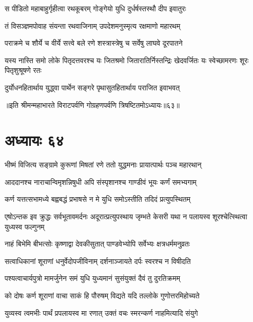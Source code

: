 \twolineshloka
{स पीडितो महाबाहुर्गृहीत्वा रथकूबरम्}
{गोङ्गेयो युधि दुर्धर्षस्तस्थौ दीप इवातुरः}


\twolineshloka
{तं विसञ्ज्ञमपोवाह संयन्ता रथवाजिनाम्}
{उपदेशमनुस्मृत्य रक्षमाणो महारथम्}


\twolineshloka
{पराक्रमे च शौर्ये च वीर्ये सत्त्वे बले रणे}
{शस्त्रास्त्रेषु च सर्वेषु लाघवे दूरपातने}


\threelineshloka
{यस्य नास्ति समो लोके पितृदत्तवरश्च यः}
{जितश्रमो जितारातिर्निस्तन्द्रिः खेदवर्जितः}
{यः स्वेच्छामरणः शूरः पितृशुश्रूषणे रतः}


\twolineshloka
{दुर्योधनहितार्थाय युद्ध्वा पार्थेन सङ्गरे}
{पृथासुतहितार्थाय पराजित इवाभवत्}

॥इति श्रीमन्महाभारते विराटपर्वणि गोग्रहणपर्वणि त्रिषष्टितमोऽध्यायः॥६३॥

\chapter{अध्यायः ६४}

\twolineshloka
{भीष्मं विजित्य सङ्ग्रामे कुरूणां मिषतां रणे}
{ततो युद्धमनाः प्रायात्पार्थः पञ्च महारथान्}


\twolineshloka
{आददानश्च नाराचान्विमृशन्निषुधी अपि}
{संस्पृशानश्च गाण्डीवं भूयः कर्णं समभ्यगाम्}




\twolineshloka
{कर्ण यत्तत्सभामध्ये बह्वबद्धं प्रभाषसे}
{न मे युधि समोऽस्तीति तदिदं प्रत्युपस्थितम्}


\threelineshloka
{एषोऽन्तक इव क्रुद्धः सर्वभूतावमर्दनः}
{अदूरात्प्रत्युपस्थाय जृम्भते केसरी यथा}
{न पलायस्व शूरश्चेत्स्थित्वा युध्यस्व फल्गुनम्}




\twolineshloka
{नाहं बिभेमि बीभत्सोः कृष्णाद्वा देवकीसुतात्}
{पाण्डवेभ्योपि सर्वेभ्यः क्षत्रधर्ममनुव्रतः}


\twolineshloka
{सत्वाधिकानां शूराणां धनुर्वेदोपजीविनाम्}
{दर्शनाञ्जायते दर्पः स्वरश्च न विषीदति}


\twolineshloka
{पश्यत्वाचार्यपुत्रो मामर्जुनेन समं युधि}
{युध्यमानं सुसंयुक्तं दैवं तु दुरतिक्रमम्}




\twolineshloka
{को दोषः कर्ण शूराणां वाचा साकं हि पौरुषम्}
{विद्यते यदि तल्लोके गुणोत्तरमिहोच्यते}


\twolineshloka
{युव्यस्व त्वमभीः पार्थं प्रपलायस्व मा रणात्}
{उक्तं वचः स्मरन्कर्ण नाहमित्यादि संयुगे}


